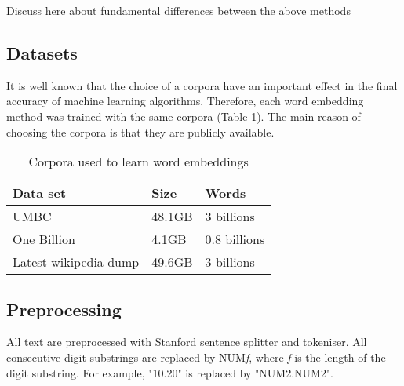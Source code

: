 {\color{blue}Discuss here about fundamental differences between the above methods}

\subsection{Datasets}
It is well known that the choice of a corpora have an important effect in the final accuracy of machine learning algorithms. 
Therefore, each word embedding method was trained with the same corpora (Table \ref{wordEmbedCorpora}). The main reason of choosing the corpora 
is that they are publicly available. 

\begin{table}[h]
\begin{center}
\begin{small}
\begin{tabular}{lll}
\hline
\textbf{Data set} & \textbf{Size} & \textbf{Words} \\ \hline
UMBC 	& 48.1GB & 3 billions \\
One Billion 	& 4.1GB & 0.8 billions  \\
Latest wikipedia dump & 49.6GB & 3 billions \\ \hline
\end{tabular}
\end{small}
\caption{Corpora used to learn word embeddings}
\label{wordEmbedCorpora}
\end{center}
\end{table}

\subsection{Preprocessing}
All text are preprocessed with Stanford sentence splitter and tokeniser. All consecutive digit substrings are replaced by NUM\textit{f}, where \textit{f} is the length of the digit substring. For example, "10.20" is replaced by "NUM2.NUM2".
